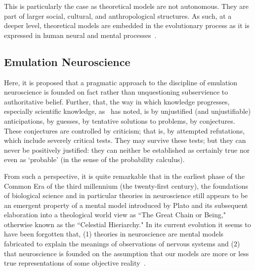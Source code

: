 \documentclass[11pt,3p,twocolumn]{JMN}
\begin{document}
This is particularly the case as theoretical models are not autonomous. They are part of larger social, cultural, and anthropological structures. As such, at a deeper level, theoretical models are embedded in the evolutionary process as it is expressed in human neural and mental processes~\citep{jacobson93}.

\subsection{Emulation Neuroscience}
\label{subsection:emuneuro}


Here, it is proposed that a pragmatic approach to the discipline of emulation neuroscience is founded on fact rather than unquestioning subservience to authoritative belief. Further, that, the way in which knowledge progresses, especially scientific knowledge, as~\citet{popper62} has noted, is by unjustified (and unjustifiable) anticipations, by guesses, by tentative solutions to problems, by conjectures. These conjectures are controlled by criticism; that is, by attempted refutations, which include severely critical tests. They may survive these tests; but they can never be positively justified: they can neither be established as certainly true nor even as `probable' (in the sense of the probability calculus).

From such a perspective, it is quite remarkable that in the earliest phase of the Common Era of the third millennium (the twenty-first century), the foundations of biological science and in particular theories in neuroscience still appears to be an emergent property of a mental model introduced by Plato and its subsequent elaboration into a theological world view as ``The Great Chain or Being," otherwise known as the ``Celestial Hieriarchy." In its current evolution it seems to have been forgotten that, (1) theories in neuroscience are mental models fabricated to explain the meanings of observations of nervous systems and (2) that neuroscience is founded on the assumption that our models are more or less true representations of some objective reality~\citep{jacobson93}.
\end{document}
